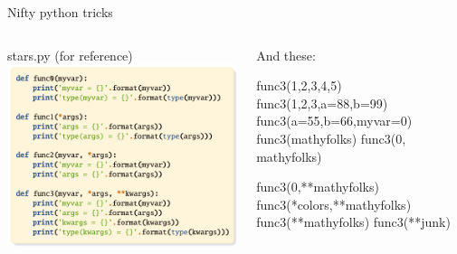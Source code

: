 \documentclass[aspectratio=169] {beamer}
\begin{document}
\begin{frame}[fragile,t]{ Nifty python tricks}

  \begin{columns}
    \begin{column}[t]{.58\textwidth}
      stars.py (for reference)
      \includegraphics[scale=.85]{stars.pdf}
    \end{column}
   
    \begin{column}[t]{.38\textwidth}
      And these:
      \begin{pythoncode}
        func3(1,2,3,4,5)
        func3(1,2,3,a=88,b=99)        
        func3(a=55,b=66,myvar=0)
        func3(mathyfolks)
        func3(0, mathyfolks)
      \end{pythoncode}
  
      \pause \small
      \begin{pythoncode}
        func3(0,**mathyfolks)
        func3(*colors,**mathyfolks)
        func3(**mathyfolks)
        func3(**junk)
      \end{pythoncode}
    \end{column}
  \end{columns}

\end{frame}
\end{document}
